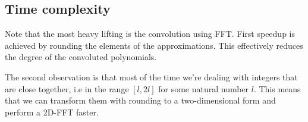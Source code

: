 \subsection{Time complexity}
Note that the most heavy lifting is the convolution using FFT. First speedup is achieved by rounding the elements of the approximations. This effectively reduces the degree of the convoluted polynomials. 

The second observation is that most of the time we're dealing with integers that are close together, i.e in the range $[l, 2l]$ for some natural number $l$. This means that we can transform them with rounding to a two-dimensional form and perform a 2D-FFT faster.